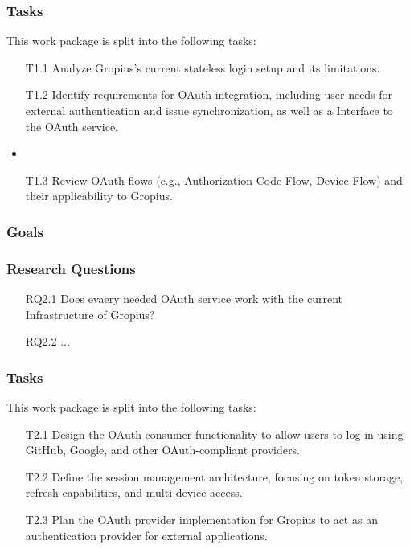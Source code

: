 \subsubsection{Tasks}
This work package is split into the following tasks:
\begin{itemize}
	\item[T1.1] Analyze Gropius's current stateless login setup and its limitations.
	\item[T1.2] Identify requirements for OAuth integration, including user needs for external authentication and issue synchronization, as well as a Interface to the OAuth service.
	\item %
	\item[T1.3] Review OAuth flows (e.g., Authorization Code Flow, Device Flow) and their applicability to Gropius.
\end{itemize}



\subsubsection{Goals}


\subsubsection{Research Questions}
\begin{itemize}
	\item[RQ2.1] Does evaery needed OAuth service work with the current Infrastructure of Gropius?
	\item[RQ2.2] ...
\end{itemize}

\subsubsection{Tasks}
This work package is split into the following tasks:
\begin{itemize}
	\item[T2.1] Design the OAuth consumer functionality to allow users to log in using GitHub, Google, and other OAuth-compliant providers.
	\item[T2.2] Define the session management architecture, focusing on token storage, refresh capabilities, and multi-device access.
	\item[T2.3] Plan the OAuth provider implementation for Gropius to act as an authentication provider for external applications.
\end{itemize}

